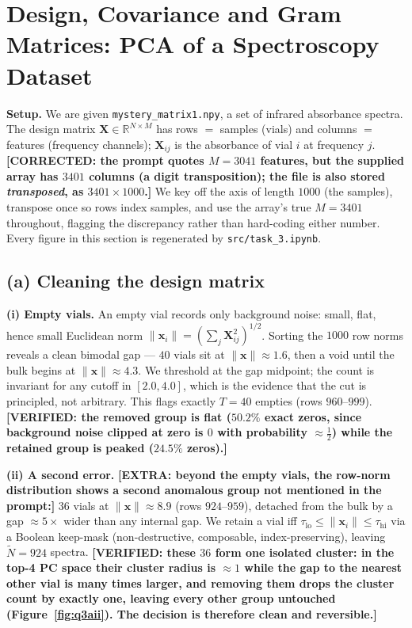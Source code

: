 \documentclass[12pt,a4paper]{article}
\newcommand{\fix}[1]{{\textbf{\textcolor{orange!85!black}{[CORRECTED: #1]}}}}
\newcommand{\extra}[1]{{\textbf{\textcolor{blue!80!black}{[EXTRA: #1]}}}}
\newcommand{\verified}[1]{{\textbf{\textcolor{green!45!black}{[VERIFIED: #1]}}}}
\theoremstyle{definition}
\newcommand{\R}{\mathbb{R}}
\newcommand{\Xb}{\mathbf{X}}
\newcommand{\xx}{\mathbf{x}}
\newcommand{\norm}[1]{\lVert #1 \rVert}
\newcommand{\Nt}{\widetilde{N}}
\begin{document}
\section{Design, Covariance and Gram Matrices: PCA of a Spectroscopy Dataset}

\textbf{Setup.} We are given \texttt{mystery\_matrix1.npy}, a set of infrared
absorbance spectra. The design matrix $\Xb\in\R^{N\times M}$ has rows $=$ samples
(vials) and columns $=$ features (frequency channels); $\Xb_{ij}$ is the absorbance of
vial $i$ at frequency $j$.
\fix{the prompt quotes $M=3041$ features, but the supplied array has $3401$ columns (a
digit transposition); the file is also stored \emph{transposed}, as $3401\times1000$.}
We key off the axis of length $1000$ (the samples), transpose once so rows index samples,
and use the array's true $M=3401$ throughout, flagging the discrepancy rather than
hard-coding either number. Every figure in this section is regenerated by
\texttt{src/task\_3.ipynb}.

\subsection{(a) Cleaning the design matrix}

\textbf{(i) Empty vials.} An empty vial records only background noise: small, flat, hence
small Euclidean norm $\norm{\xx_i}=(\sum_j \Xb_{ij}^2)^{1/2}$. Sorting the $1000$ row norms
reveals a clean bimodal gap --- $40$ vials sit at $\norm{\xx}\approx1.6$, then a void until
the bulk begins at $\norm{\xx}\approx4.3$. We threshold at the gap midpoint; the count is
invariant for any cutoff in $[2.0,4.0]$, which is the evidence that the cut is principled,
not arbitrary. This flags exactly $T=40$ empties (rows $960$--$999$).
\verified{the removed group is flat ($50.2\%$ exact zeros, since background noise clipped
at zero is $0$ with probability $\approx\tfrac12$) while the retained group is peaked
($24.5\%$ zeros).}

\textbf{(ii) A second error.}
\extra{beyond the empty vials, the row-norm distribution shows a second anomalous group not
mentioned in the prompt:} $36$ vials at $\norm{\xx}\approx8.9$ (rows $924$--$959$), detached
from the bulk by a gap $\approx5\times$ wider than any internal gap. We retain a vial iff
$\tau_{\mathrm{lo}}\le\norm{\xx_i}\le\tau_{\mathrm{hi}}$ via a Boolean keep-mask
(non-destructive, composable, index-preserving), leaving $\Nt=924$ spectra.
\verified{these $36$ form one isolated cluster: in the top-4 PC space their cluster radius
is $\approx 1$ while the gap to the nearest other vial is many times larger, and removing
them drops the cluster count by exactly one, leaving every other group untouched
(Figure~\ref{fig:q3aii}). The decision is therefore clean and reversible.}
\end{document}
